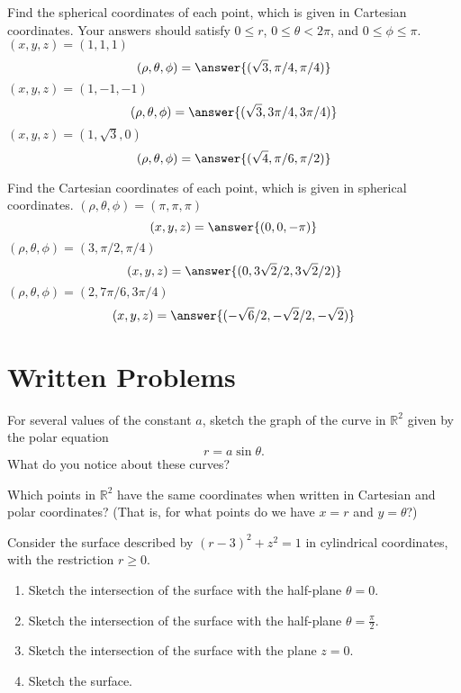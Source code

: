 \documentclass{ximera}
\begin{document}
\begin{problem}
Find the spherical coordinates of each point, which is given in Cartesian coordinates. Your answers should satisfy $0\leq r$, $0\leq\theta < 2\pi$, and $0\leq \phi\leq \pi$.
$(x,y,z) = (1,1,1)$
\[
(\rho,\theta,\phi) = \answer{(\sqrt{3}, \pi/4, \pi/4)}
\]
$(x,y,z) = (1, -1, -1)$
\[
(\rho,\theta,\phi) = \answer{(\sqrt{3}, 3\pi/4, 3\pi/4)}
\]
$(x,y,z) = (1,\sqrt{3},0)$
\[
(\rho,\theta,\phi) = \answer{(\sqrt{4}, \pi/6, \pi/2)}
\]
\end{problem}

\begin{problem}
Find the Cartesian coordinates of each point, which is given in spherical coordinates.
$(\rho,\theta,\phi) = (\pi,\pi,\pi)$
\[
(x,y,z) = \answer{(0, 0, -\pi)}
\]
$(\rho,\theta,\phi) = (3,\pi/2,\pi/4)$
\[
(x,y,z) = \answer{(0, 3\sqrt{2}/2, 3\sqrt{2}/2)}
\]
$(\rho,\theta,\phi) = (2,7\pi/6,3\pi/4)$
\[
(x,y,z) = \answer{(-\sqrt{6}/2, -\sqrt{2}/2, -\sqrt{2})}
\]

\end{problem}


\section{Written Problems}
\begin{problem}
For several values of the constant $a$, sketch the graph of the curve in $\mathbb{R}^2$ given by the polar equation
\[
r = a\sin\theta .
\]
What do you notice about these curves?
\end{problem}

\begin{problem}
Which points in $\mathbb{R}^2$ have the same coordinates when written in Cartesian and polar coordinates? (That is, for what points do we have $x=r$ and $y=\theta$?)
\end{problem}

\begin{problem}
Consider the surface described by $(r-3)^2 +z^2 = 1$ in cylindrical coordinates, with the restriction $r\geq 0$.
\begin{enumerate}
\item Sketch the intersection of the surface with the half-plane $\theta = 0$.
\item Sketch the intersection of the surface with the half-plane $\theta = \frac{\pi}{2}$.
\item Sketch the intersection of the surface with the plane $z = 0$. 
\item Sketch the surface.
\end{enumerate}
\end{problem}
\end{document}
